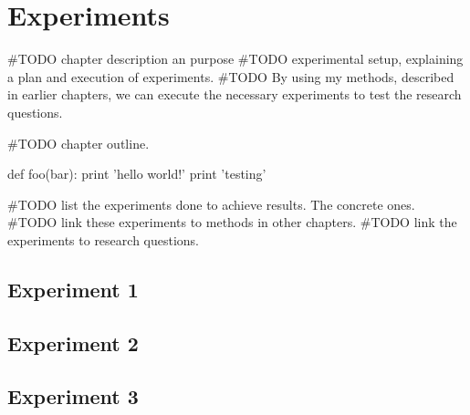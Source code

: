 \chapter{Experiments}\label{experiments}
#TODO chapter description an purpose
#TODO experimental setup, explaining a plan and execution of experiments.  
#TODO By using my methods, described in earlier chapters, we can execute the
necessary experiments to test the research questions. 


#TODO chapter outline. 

\begin{python}
def foo(bar):
    print 'hello world!'
	print 'testing'
\end{python}

#TODO list the experiments done to achieve results. The concrete ones. 
#TODO link these experiments to methods in other chapters.  
#TODO link the experiments to research questions. 
\section{Experiment 1}

\section{Experiment 2}

\section{Experiment 3}

